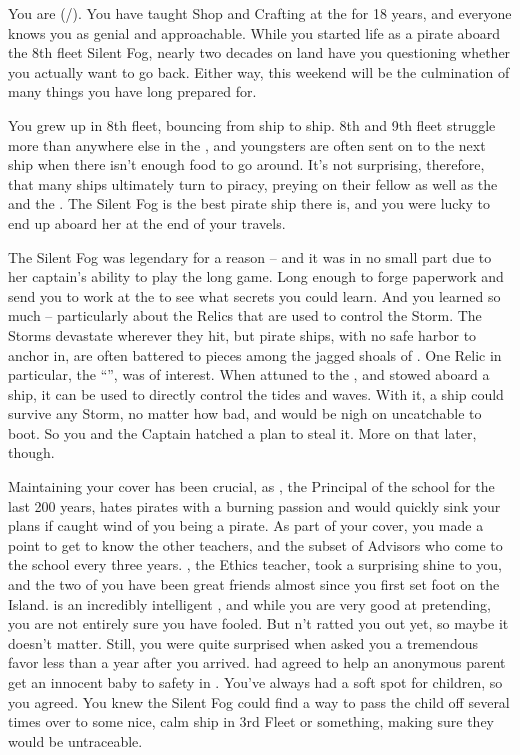 \documentclass[char]{GL2020}
\begin{document}
\name{\cPirate{}}

You are \cPirate{\full} (\cPirate{\they}/\cPirate{\them}). You have taught Shop and Crafting at the \pSchool{} for 18 years, and everyone knows you as genial and approachable. While you started life as a pirate aboard the 8th fleet Silent Fog, nearly two decades on land have you questioning whether you actually want to go back. Either way, this weekend will be the culmination of many things you have long prepared for.

You grew up in 8th fleet, bouncing from ship to ship. 8th and 9th fleet struggle more than anywhere else in the \pShip{}, and youngsters are often sent on to the next ship when there isn't enough food to go around. It's not surprising, therefore, that many ships ultimately turn to piracy, preying on their fellow \pShippies{} as well as the \pFarm{} and the \pTech{}. The Silent Fog is the best pirate ship there is, and you were lucky to end up aboard her at the end of your travels.

The Silent Fog was legendary for a reason -- and it was in no small part due to her captain's ability to play the long game. Long enough to forge paperwork and send you to work at the \pSchool{} to see what secrets you could learn. And you learned so much -- particularly about the Relics that are used to control the Storm. The Storms devastate wherever they hit, but pirate ships, with no safe harbor to anchor in, are often battered to pieces among the jagged shoals of \pWod{}. One Relic in particular, the ``\iNet{}'', was of interest. When attuned to the \pShip{}, and stowed aboard a ship, it can be used to directly control the tides and waves. With it, a ship could survive any Storm, no matter how bad, and would be nigh on uncatchable to boot. So you and the Captain hatched a plan to steal it. More on that later, though.

Maintaining your cover has been crucial, as \cPrincipal{\full}, the Principal of the school for the last 200 years, hates pirates with a burning passion and would quickly sink your plans if \cPrincipal{\they} caught wind of you being a pirate. As part of your cover, you made a point to get to know the other teachers, and the subset of Advisors who come to the school every three years. \cEthics{\full}, the Ethics teacher, took a surprising shine to you, and the two of you have been great friends almost since you first set foot on the Island. \cEthics{} is an incredibly intelligent \cEthics{\person}, and while you are very good at pretending, you are not entirely sure you have \cEthics{\them} fooled. But \cEthics{\they} \cEthics{\have}n't ratted you out yet, so maybe it doesn't matter. Still, you were quite surprised when \cEthics{\they} asked you a tremendous favor less than a year after you arrived. \cEthics{} had agreed to help an anonymous parent get an innocent baby to safety in \pShip{}. You've always had a soft spot for children, so you agreed. You knew the Silent Fog could find a way to pass the child off several times over to some nice, calm ship in 3rd Fleet or something, making sure they would be untraceable.
\end{document}
